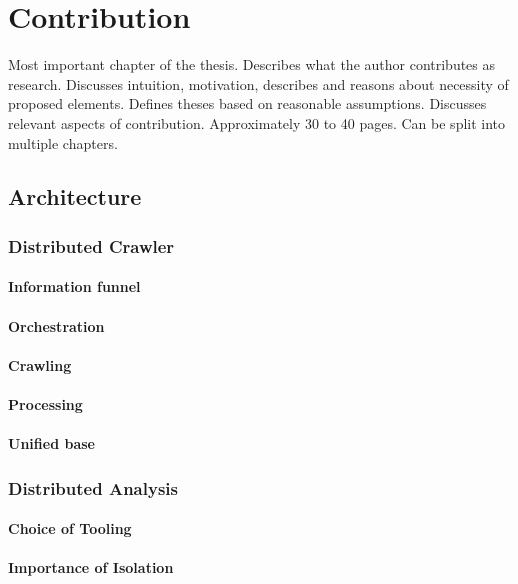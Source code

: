 \chapter{Contribution}

Most important chapter of the thesis. Describes what the author contributes as research. Discusses intuition, motivation, describes and reasons about necessity of proposed elements. Defines theses based on reasonable assumptions. Discusses relevant aspects of contribution. Approximately 30 to 40 pages. Can be split into multiple chapters.

\section{Architecture}
\subsection{Distributed Crawler}
\subsubsection{Information funnel}
\subsubsection{Orchestration}
\subsubsection{Crawling}
\subsubsection{Processing}
\subsubsection{Unified base}
\subsection{Distributed Analysis}
\subsubsection{Choice of Tooling}
\subsubsection{Importance of Isolation}

